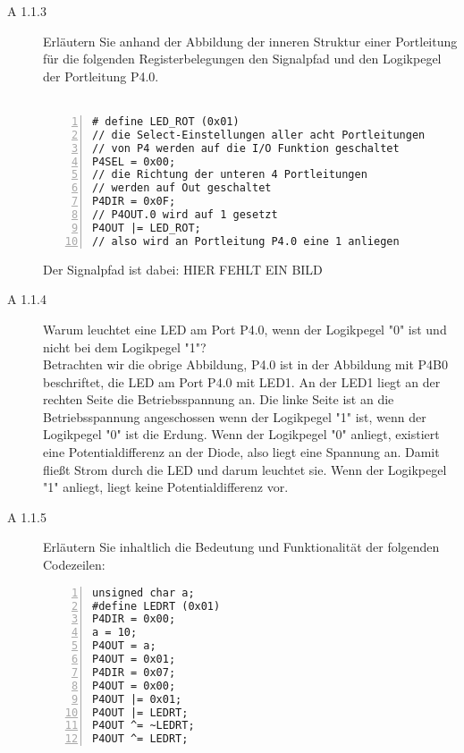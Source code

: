 \documentclass[11pt,a4paper,ngerman]{article}
\begin{document}
\begin{description}
	
	\item[A 1.1.3] Erläutern Sie anhand der Abbildung der inneren Struktur einer Portleitung für die folgenden Registerbelegungen den Signalpfad und den Logikpegel der Portleitung P4.0. \\ \\
		\begin{lstlisting}[numbers=left]
# define LED_ROT (0x01)
// die Select-Einstellungen aller acht Portleitungen
// von P4 werden auf die I/O Funktion geschaltet
P4SEL = 0x00;
// die Richtung der unteren 4 Portleitungen 
// werden auf Out geschaltet
P4DIR = 0x0F;
// P4OUT.0 wird auf 1 gesetzt
P4OUT |= LED_ROT;
// also wird an Portleitung P4.0 eine 1 anliegen
		\end{lstlisting}
		
		Der Signalpfad ist dabei:
		HIER FEHLT EIN BILD
	
	\item[A 1.1.4] Warum leuchtet eine LED am Port P4.0, wenn der Logikpegel "0" ist und nicht bei dem Logikpegel "1"? \\
	
		Betrachten wir die obrige Abbildung, P4.0 ist in der Abbildung mit P4B0 beschriftet, die LED am Port P4.0 mit LED1.	An der LED1 liegt an der rechten Seite die Betriebsspannung an. Die linke Seite ist an die Betriebsspannung angeschossen
	wenn der Logikpegel "1" ist, wenn der Logikpegel "0" ist die Erdung. Wenn der Logikpegel "0" anliegt, existiert eine Potentialdifferenz an der Diode,
	also liegt eine Spannung an. Damit fließt Strom durch die LED und darum leuchtet sie. Wenn der Logikpegel "1" anliegt, liegt keine
	Potentialdifferenz vor.


	\item[A 1.1.5] Erläutern Sie inhaltlich die Bedeutung und Funktionalität der folgenden Codezeilen: \\
		\begin{lstlisting}[numbers=left]
unsigned char a;
#define LEDRT (0x01)
P4DIR = 0x00;
a = 10;
P4OUT = a;
P4OUT = 0x01;
P4DIR = 0x07;
P4OUT = 0x00;
P4OUT |= 0x01;
P4OUT |= LEDRT;
P4OUT ^= ~LEDRT;
P4OUT ^= LEDRT;
		\end{lstlisting}
		

\end{description}
\end{document}
